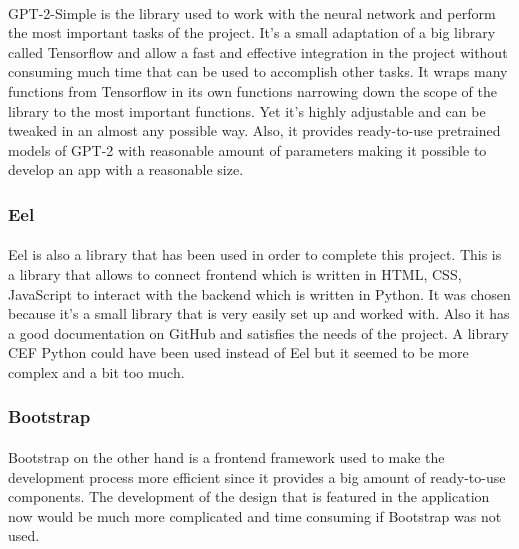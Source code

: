 \documentclass[12pt]{report}
\begin{document}
\paragraph{}
GPT-2-Simple is the library used to work with the neural network and perform the most important tasks of the project.
It's a small adaptation of a big library called Tensorflow and allow a fast and effective integration in the project
without consuming much time that can be used to accomplish other tasks. It wraps many functions from Tensorflow in
its own functions narrowing down the scope of the library to the most important functions. Yet it's highly adjustable
and can be tweaked in an almost any possible way. Also, it provides ready-to-use pretrained models of GPT-2 with
reasonable amount of parameters making it possible to develop an app with a reasonable size.

\subsubsection*{Eel}
\paragraph{}
Eel is also a library that has been used in order to complete this project. This is a library that allows to connect
frontend which is written in HTML, CSS, JavaScript to interact with the backend which is written in Python. It was chosen
because it's a small library that is very easily set up and worked with. Also it has a good documentation on GitHub and
satisfies the needs of the project. A library CEF Python could have been used instead of Eel but it seemed to be more
complex and a bit too much.

\subsubsection*{Bootstrap}
\paragraph{}
Bootstrap on the other hand is a frontend framework used to make the development process more efficient since it provides a big
amount of ready-to-use components. The development of the design that is featured in the application now would be much more
complicated and time consuming if Bootstrap was not used.

\clearpage
\end{document}
